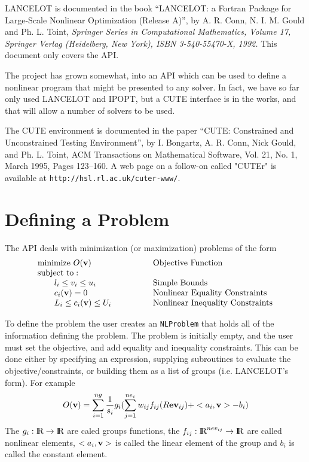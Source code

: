 \documentclass[12pt]{article}
\def\R{\hbox{\rm I\kern-.2150em R}}
\def\into{\rightarrow}
\begin{document}
    LANCELOT is documented in the book ``LANCELOT: a Fortran Package for
    Large-Scale Nonlinear Optimization (Release A)'', by A. R. Conn, 
    N. I. M. Gould and Ph. L. Toint, {\it Springer Series in Computational 
    Mathematics, Volume 17, Springer Verlag (Heidelberg, New York), 
    ISBN 3-540-55470-X, 1992.} This document only covers the API.

    The project has grown somewhat, into an API which can be used to define a
    nonlinear program that might be presented to any solver.
    In fact, we have so far only used LANCELOT and IPOPT, but a CUTE interface
    is in the works, and that will allow a number of solvers to be used.

    The CUTE environment is documented in the paper ``CUTE: Constrained and Unconstrained
    Testing Environment'', by I. Bongartz, A. R. Conn, Nick Gould, and Ph. L. Toint,
    ACM Transactions on Mathematical Software, Vol. 21, No. 1, March 1995, Pages 123--160.
    A web page on a follow-on called "CUTEr" is available at {\tt http://hsl.rl.ac.uk/cuter-www/}.

   \section{Defining a Problem}

   The API deals with minimization (or maximization) problems of the form
   \begin{displaymath}
     \begin{array}{ll}
      {\rm minimize}~O({\bf v})& \qquad\qquad \rm Objective~Function\\
      {\rm subject~to:}\\
      \qquad l_i \leq v_i \leq u_i& \qquad\qquad  \rm Simple~Bounds\\
      \qquad c_i({\bf v}) = 0& \qquad\qquad \rm Nonlinear~Equality
                                                      ~Constraints\\
      \qquad L_i \leq c_i({\bf v}) \leq U_i& \qquad\qquad \rm Nonlinear
                                                      ~Inequality~Constraints\\
     \end{array}
   \end{displaymath}

     To define the problem the user creates an {\tt NLProblem} that
    holds all of the information defining the problem. The problem is initially
    empty, and the user must set the objective, and add equality and inequality constraints.
    This can be done either by specifying an expression, supplying subroutines to evaluate the
    objective/constraints, or building them as a list of groups (i.e. LANCELOT's form). For example
    \begin{displaymath}
     O({\bf v}) = \sum_{i=1}^{ng} {1\over s_i}g_i( \sum_{j=1}^{ne_i} w_{ij} f_{ij}(R {\bf ev}_{ij}) 
             + <a_i,{\bf v}> - b_i)
    \end{displaymath}
    The $g_i:\R\into\R$ are caled groups functions, the $f_{ij}:\R^{nev_{ij}}\into\R$ are called nonlinear
    elements, $<a_i,{\bf v}>$ is called the linear element of the group and $b_i$ is called 
    the constant element.
\end{document}
